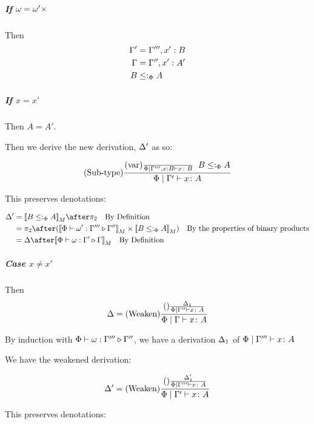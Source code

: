 \documentclass{report}
\begin{document}
        \subparagraph{If $\omega = \omega'\times$} 
        Then 
        \begin{align}
            \Gamma' & = \Gamma''', x': B\\
            \Gamma &= \Gamma'', x': A'\\
            B & \leq:_\Phi A
        \end{align}

        \subparagraph{If $x = x'$}

        Then $A = A'$.

        Then we derive the new derivation, $\Delta'$ as so:

        \begin{equation}
            (\text{Sub-type}) \frac{
                (\text{var}) \frac{}{\Phi\mid\Gamma''', x: B \vdash x \colon B}
                \;\;
                B \leq:_\Phi A
            }{
                \Phi\mid\Gamma' \vdash x \colon A
            }
        \end{equation}

        This preserves denotations:

        \begin{align}
            \D' & = \deno{B\subtypep A}\after\pp\qt{By Definition} \\
             & = \pp\after (\deno{\ewrel{\P}{\w'}{\G'''}{\G''}}\times \deno{B\subtypep A}) \qt{By the properties of binary products}\\
             & = \D\after\deno{\ewrel{\P}{\w}{\G'}{\G}}\qt{By Definition}
        \end{align}

        \subparagraph{Case $x \neq x'$}
        Then 
        \begin{equation}
            \Delta = (\text{Weaken}) \frac{(\text{}) \frac{\Delta_1}{\Phi\mid\Gamma'' \vdash x \colon A}}{\Phi\mid\Gamma \vdash x \colon A}
        \end{equation}

        By induction with $\Phi\vdash \omega : \Gamma''' \triangleright \Gamma''$,
         we have a derivation $\Delta_1$ of $\Phi\mid\Gamma''' \vdash x \colon A$

        We have the weakened derivation:

        \begin{equation}
            \Delta' = (\text{Weaken}) \frac{(\text{}) \frac{\Delta_1'}{\Phi\mid\Gamma''' \vdash x \colon A}}{\Phi\mid\Gamma' \vdash x \colon A}
        \end{equation}

        This preserves denotations:
\end{document}

